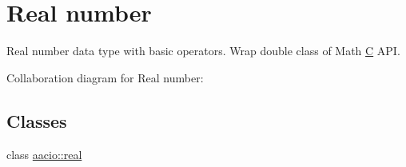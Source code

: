 \hypertarget{group__real}{}\section{Real number}
\label{group__real}


Real number data type with basic operators. Wrap double class of Math \mbox{\hyperlink{struct_c}{C}} A\+PI.  


Collaboration diagram for Real number\+:
\subsection*{Classes}
\begin{DoxyCompactItemize}
\item 
class \mbox{\hyperlink{classaacio_1_1real}{aacio\+::real}}
\end{DoxyCompactItemize}
